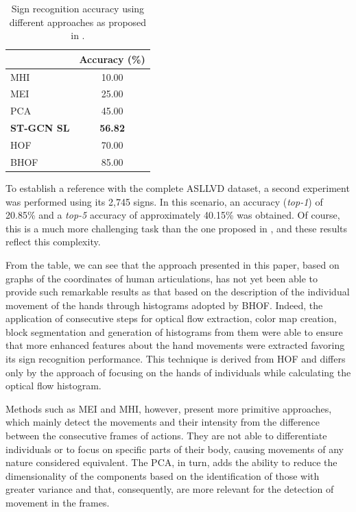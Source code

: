 \begin{table}[ht]
\centering
\caption{Sign recognition accuracy using different approaches \newline 
    as proposed in \cite{lim-2016}.}
\label{tab:results-comparison-20}
\begin{tabular}{lc}
\hline
                   & Accuracy (\%)  \\ \hline
MHI                & 10.00                     \\
MEI                & 25.00                     \\
PCA                & 45.00                     \\
\textbf{ST-GCN SL} & \textbf{56.82}            \\
HOF                & 70.00                     \\
BHOF               & 85.00                     \\ \hline
\end{tabular}
\end{table}

To establish a reference with the complete ASLLVD dataset, a second experiment was performed using its 2,745 signs. In this scenario, an accuracy (\textit{top-1}) of 20.85\% and a \textit{top-5} accuracy of approximately 40.15\% was obtained. Of course, this is a much more challenging task than the one proposed in \cite{lim-2016}, and these results reflect this complexity.

From the table, we can see that the approach presented in this paper, based on graphs of the coordinates of human articulations, has not yet been able to provide such remarkable results as that based on the description of the individual movement of the hands through histograms adopted by BHOF. Indeed, the application of consecutive steps for optical flow extraction, color map creation, block segmentation and generation of histograms from them were able to ensure that more enhanced features about the hand movements were extracted favoring its sign recognition performance. This technique is derived from HOF and differs only by the approach of focusing on the hands of individuals while calculating the optical flow histogram.

Methods such as MEI and MHI, however, present more primitive approaches, which mainly detect the movements and their intensity from the difference between the consecutive frames of actions. They are not able to differentiate individuals or to focus on specific parts of their body, causing movements of any nature considered equivalent. The PCA, in turn, adds the ability to reduce the dimensionality of the components based on the identification of those with greater variance and that, consequently, are more relevant for the detection of movement in the frames.

